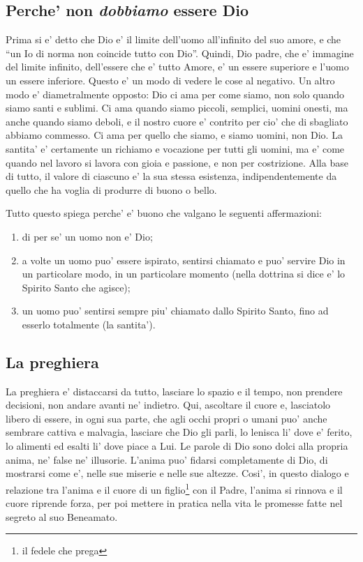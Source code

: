 \subsection{Perche' non \emph{dobbiamo} essere Dio}
Prima si e' detto che Dio e' il limite dell'uomo all'infinito del suo amore, e che ``un Io di norma non coincide tutto con Dio''.
Quindi, Dio padre, che e' immagine del limite infinito, dell'essere che e' tutto Amore, e' un essere superiore e l'uomo un essere inferiore.
Questo e' un modo di vedere le cose al negativo. Un altro modo e' diametralmente opposto: Dio ci ama per come siamo, non solo quando siamo santi e sublimi. Ci ama quando siamo piccoli, semplici, uomini onesti, ma anche quando siamo deboli, e il nostro cuore e' contrito per cio' che di sbagliato abbiamo commesso. Ci ama per quello che siamo, e siamo uomini, non Dio. La santita' e' certamente un richiamo e vocazione per tutti gli uomini, ma e' come quando nel lavoro si lavora con gioia e passione, e non per costrizione. Alla base di tutto, il valore di ciascuno e' la sua stessa esistenza, indipendentemente da quello che ha voglia di produrre di buono o bello.

Tutto questo spiega perche' e' buono che valgano le seguenti affermazioni:
\begin{enumerate}
    \item di per se' un uomo non e' Dio;
    \item a volte un uomo puo' essere ispirato, sentirsi chiamato e puo' servire Dio in un particolare modo, in un particolare momento (nella dottrina si dice e' lo Spirito Santo che agisce);
    \item un uomo puo' sentirsi sempre piu' chiamato dallo Spirito Santo, fino ad esserlo totalmente (la santita').
\end{enumerate}


\subsection{La preghiera}
La preghiera e' distaccarsi da tutto, lasciare lo spazio e il tempo, non prendere decisioni, non andare avanti ne' indietro. Qui, ascoltare il cuore e, lasciatolo libero di essere, in ogni sua parte, che agli occhi propri o umani puo' anche sembrare cattiva e malvagia, lasciare che Dio gli parli, lo lenisca li' dove e' ferito, lo alimenti ed esalti li' dove piace a Lui. Le parole di Dio sono dolci alla propria anima, ne' false ne' illusorie. L'anima puo' fidarsi completamente di Dio, di mostrarsi come e', nelle sue miserie e nelle sue altezze. Cosi', in questo dialogo e relazione tra l'anima e il cuore di un figlio\footnote{il fedele che prega} con il Padre, l'anima si rinnova e il cuore riprende forza, per poi mettere in pratica nella vita le promesse fatte nel segreto al suo Beneamato.

